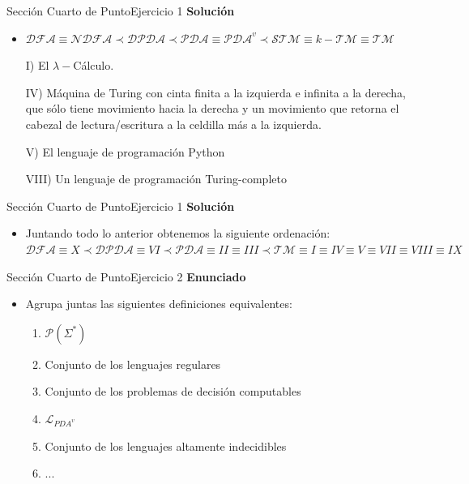 \documentclass[10pt, envcountsect, presentation, aspectratio=169]{beamer}
\newcommand{\lpdav}{\ensuremath{\mathcal L_{PDA^v}}}
\begin{document}
\begin{frame}{Sección Cuarto de Punto}{Ejercicio 1}
    \textbf{Solución}\\
    \begin{itemize}
        \item $\mathcal{DFA} \equiv \mathcal{NDFA} \prec \mathcal{DPDA} \prec \mathcal{PDA} \equiv \mathcal{PDA}^v \prec \mathcal{STM} \equiv k-\mathcal{TM} \equiv \mathcal{TM}$
        \item[I)] El $\lambda-$Cálculo.
        \item[IV)] Máquina de Turing con cinta finita a la izquierda e infinita a la derecha, que sólo tiene movimiento hacia la derecha y un movimiento que retorna el cabezal de lectura/escritura a la celdilla más a la izquierda.
        \item[V)] El lenguaje de programación Python
        \item[VIII)] Un lenguaje de programación Turing-completo 
    \end{itemize}
\end{frame}


\begin{frame}{Sección Cuarto de Punto}{Ejercicio 1}
    \textbf{Solución}\\
    \begin{itemize}
        \item Juntando  todo lo anterior obtenemos la siguiente ordenación:\\
        \vspace{3mm}
        $\mathcal{DFA} \equiv X \prec \mathcal{DPDA} \equiv VI \prec \mathcal{PDA} \equiv II \equiv III \prec \mathcal{TM} \equiv I \equiv IV \equiv V \equiv VII \equiv VIII \equiv IX$
    \end{itemize}
\end{frame}

\begin{frame}{Sección Cuarto de Punto}{Ejercicio 2}
\textbf{Enunciado}
	\begin{itemize}
        \item Agrupa juntas las siguientes definiciones equivalentes:
        \begin{enumerate}[1.]
            \item $\mathcal{P}( \Sigma ^ *)$
            \item Conjunto de los lenguajes regulares
            \item Conjunto de los problemas de decisión computables
            \item $\lpdav$
            \item Conjunto de los lenguajes altamente indecidibles
            \item ...
        \end{enumerate}
	\end{itemize}
\end{frame}
\end{document}
